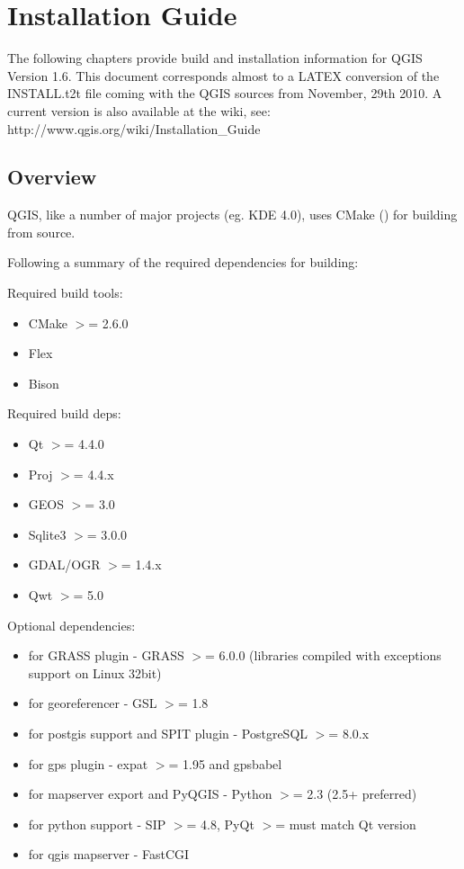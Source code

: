 

\section{Installation Guide}

The following chapters provide build and installation information for QGIS Version 1.6. This document
corresponds almost to a LATEX conversion of the INSTALL.t2t file coming with the QGIS sources from
November, 29th 2010.
A current version is also available at the wiki, see: http://www.qgis.org/wiki/Installation\_Guide

\hypertarget{toc2}{}
\subsection{Overview}
QGIS, like a number of major projects (eg. KDE 4.0), uses CMake
() for building from source.

Following a summary of the required dependencies for building:

Required build tools:

\begin{itemize}
\item CMake $>$= 2.6.0
\item Flex
\item Bison
\end{itemize}


Required build deps:

\begin{itemize}
\item Qt $>$= 4.4.0
\item Proj $>$= 4.4.x
\item GEOS $>$= 3.0
\item Sqlite3 $>$= 3.0.0
\item GDAL/OGR $>$= 1.4.x
\item Qwt $>$= 5.0
\end{itemize}


Optional dependencies:

\begin{itemize}
\item for GRASS plugin - GRASS $>$= 6.0.0 (libraries compiled with exceptions support on Linux 32bit)
\item for georeferencer - GSL $>$= 1.8
\item for postgis support and SPIT plugin - PostgreSQL $>$= 8.0.x
\item for gps plugin - expat $>$= 1.95 and gpsbabel
\item for mapserver export and PyQGIS - Python $>$= 2.3 (2.5+ preferred)
\item for python support - SIP $>$= 4.8, PyQt $>$= must match Qt version
\item for qgis mapserver - FastCGI
\end{itemize}




